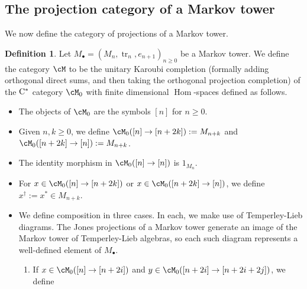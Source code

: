 \documentclass[11pt]{article}
\theoremstyle{plain}
\theoremstyle{definition}
\newtheorem{defn}[thm]{Definition}
\DeclareMathOperator{\Hom}{Hom}
\DeclareMathOperator{\tr}{tr}
\newcommand{\set}[2]{\left\{#1 \middle| #2\right\}}
\newcommand{\Cstar}{\rm{C^*}}
\newcommand{\nn}[1]{\textcolor{red}{[[#1]]}}
\begin{document}
\subsection{The projection category of a Markov tower}

We now define the category of projections of a Markov tower. 


\begin{defn}
\label{def:MarkovProjections}
Let $M_\bullet = (M_n, \tr_n, e_{n+1})_{n\geq 0}$ be a Markov tower.
We define the category $\cM$ to be the unitary Karoubi completion (formally adding orthogonal direct sums, and then taking the orthogonal projection completion) of the $\Cstar$ category $\cM_0$ with finite dimensional $\Hom$-spaces defined as follows.
\begin{itemize}
\item
The objects of $\cM_0$ are the symbols $[n]$ for $n\geq 0$.
\item
Given $n,k \geq 0$, we define 
$\cM_0([n] \to [n+2k]):= M_{n+k}$
and
$\cM_0([n+2k] \to [n]) := M_{n+k}$.
\item
The identity morphism in $\cM_0([n] \to [n])$ is $1_{M_n}$.
\item
For $x\in \cM_0([n]\to [n+2k])$ or $x\in \cM_0([n+2k] \to [n])$, we define $x^\dag := x^* \in M_{n+k}$.
%
\item
We define composition in three cases. In each, we make use of Temperley-Lieb diagrams. The Jones projections of a Markov tower generate an image of the Markov tower of Temperley-Lieb algebras, so each such diagram represents a well-defined element of $M_\bullet$. 
\begin{enumerate}[label={\rm(C\arabic*)}]
\item
\label{compose:upup}
If $x\in \cM_0([n] \to [n+2i])$ and $y\in \cM_0([n+2i] \to [n+2i+2j])$, we define 

\end{enumerate}
\end{itemize}
\end{defn}
\end{document}
